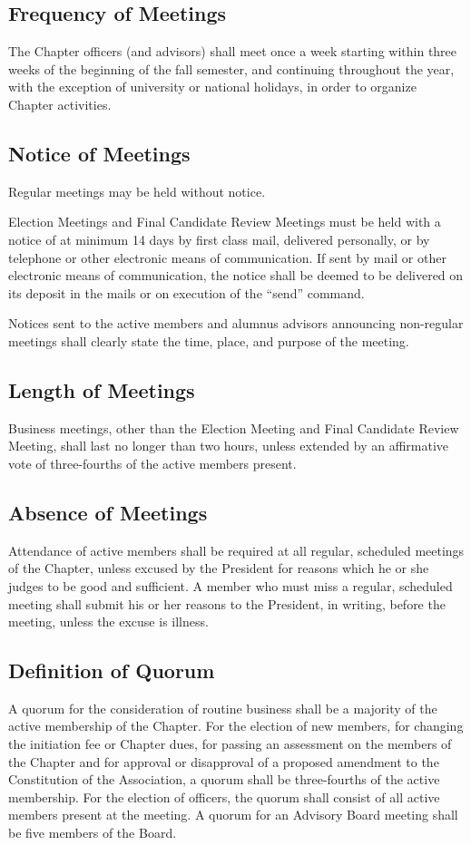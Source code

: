 \documentclass{article}
\begin{document}
	\subsection{Frequency of Meetings}	
	The Chapter officers (and advisors) shall meet once a week starting within three weeks of the beginning of the fall semester, and continuing throughout the year, with the exception of university or national holidays, in order to organize Chapter activities.
	\subsection{Notice of Meetings}
	Regular meetings may be held without notice.
	
	Election Meetings and Final Candidate Review Meetings must be held with a notice of at minimum 14 days by first­ class mail, delivered personally, or by telephone or other electronic means of communication. If sent by mail or other electronic means of communication, the notice shall be deemed to be delivered on its deposit in the mails or on execution of the ``send'' command.
	
	Notices sent to the active members and alumnus advisors announcing non-regular meetings shall clearly state the time, place, and purpose of the meeting.
	
	\subsection{Length of Meetings}
	Business meetings, other than the Election Meeting and Final Candidate Review Meeting, shall last no longer than two hours, unless extended by an affirmative vote of three-fourths of the active members present.
	\subsection{Absence of Meetings}
	Attendance of active members shall be required at all regular, scheduled meetings of the Chapter, unless excused by the President for reasons which he or she judges to be good and sufficient. A member who must miss a regular, scheduled meeting shall submit his or her reasons to the President, in writing, before the meeting, unless the excuse is illness.
	\subsection{Definition of Quorum}
	A quorum for the consideration of routine business shall be a majority of the active membership of the Chapter. For the election of new members, for changing the initiation fee or Chapter dues, for passing an assessment on the members of the Chapter and for approval or disapproval of a proposed amendment to the Constitution of the Association, a quorum shall be three-fourths of the active membership. For the election of officers, the quorum shall consist of all active members present at the meeting. A quorum for an Advisory Board meeting shall be five members of the Board.
\end{document}
